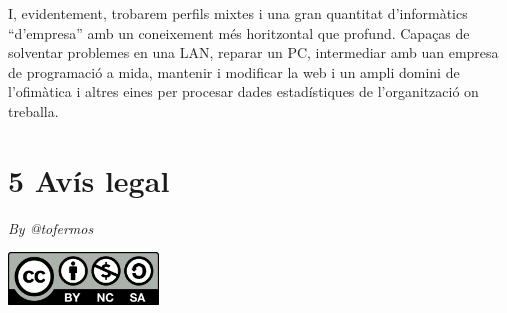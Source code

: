 \documentclass[
  12 pt,
  a4paper,
]{article}
\begin{document}
I, evidentement, trobarem perfils mixtes i una gran quantitat
d'informàtics ``d'empresa'' amb un coneixement més horitzontal que
profund. Capaças de solventar problemes en una LAN, reparar un PC,
intermediar amb uan empresa de programació a mida, mantenir i modificar
la web i un ampli domini de l'ofimàtica i altres eines per procesar
dades estadístiques de l'organització on treballa.

\section{5 Avís legal}\label{avuxeds-legal}

\emph{By @tofermos}

\includegraphics[width=0.3\textwidth,height=\textheight]{../recursos/cc-by-nc-sa.png}
\end{document}
